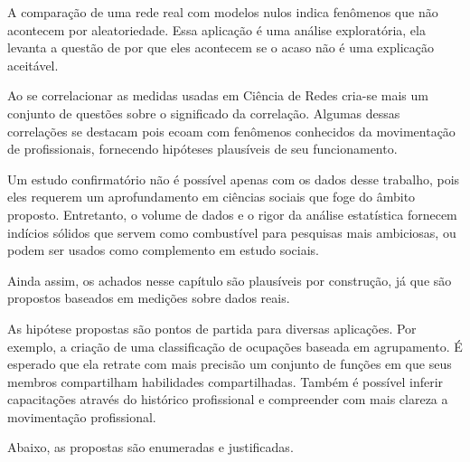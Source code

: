 \documentclass[12pt,a4paper,final]{article}
\begin{document}
A comparação de uma rede real com modelos nulos indica fenômenos que não acontecem por aleatoriedade. Essa aplicação é uma análise exploratória, ela levanta a questão de por que eles acontecem se o acaso não é uma explicação aceitável.

Ao se correlacionar as medidas usadas em Ciência de Redes cria-se mais um conjunto de questões sobre o significado da correlação. Algumas dessas correlações se destacam pois ecoam com fenômenos conhecidos da movimentação de profissionais, fornecendo hipóteses plausíveis de seu funcionamento.

Um estudo confirmatório não é possível apenas com os dados desse trabalho, pois eles requerem um aprofundamento em ciências sociais que foge do âmbito proposto. Entretanto, o volume de dados e o rigor da análise estatística fornecem indícios sólidos que servem como combustível para pesquisas mais ambiciosas, ou podem ser usados como complemento em estudo sociais.

Ainda assim, os achados nesse capítulo são plausíveis por construção, já que são propostos baseados em medições sobre dados reais.

As hipótese propostas são pontos de partida para diversas aplicações. Por exemplo, a criação de uma classificação de ocupações baseada em agrupamento. É esperado que ela retrate com mais precisão um conjunto de funções em que seus membros compartilham habilidades compartilhadas. Também é possível inferir capacitações através do histórico profissional e compreender com mais clareza a movimentação profissional.

Abaixo, as propostas são enumeradas e justificadas.
\end{document}
